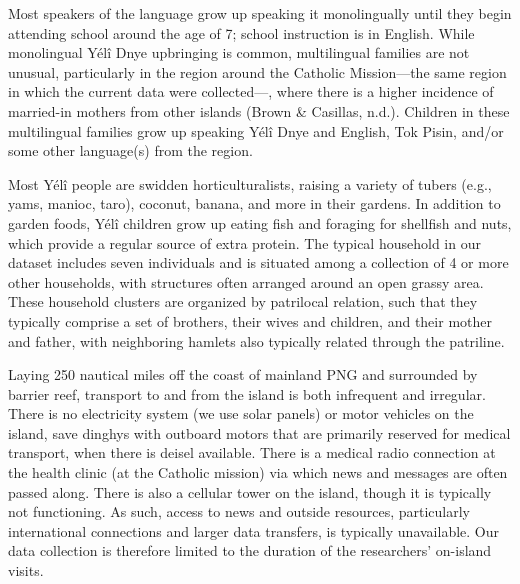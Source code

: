\documentclass[english,,man,floatsintext]{apa6}
\begin{document}
Most speakers of the language grow up speaking it monolingually until they begin attending school around the age of 7;
school instruction is in English. While monolingual Yélî Dnye upbringing is common, multilingual families are not unusual, particularly in the region around the Catholic Mission---the same region in which the current data were collected---, where there is a higher incidence of married-in mothers from other islands (Brown \& Casillas, n.d.). Children in these multilingual families grow up speaking Yélî Dnye and English, Tok Pisin, and/or some other language(s) from the region.

Most Yélî people are swidden horticulturalists, raising a variety of tubers (e.g., yams, manioc, taro), coconut, banana, and more in their gardens. In addition to garden foods, Yélî children grow up eating fish and foraging for shellfish and nuts, which provide a regular source of extra protein. The typical household in our dataset includes seven individuals and is situated among a collection of 4 or more other households, with structures often arranged around an open grassy area. These household clusters are organized by patrilocal relation, such that they typically comprise a set of brothers, their wives and children, and their mother and father, with neighboring hamlets also typically related through the patriline.

Laying 250 nautical miles off the coast of mainland PNG and surrounded by barrier reef, transport to and from the island is both infrequent and irregular. There is no electricity system (we use solar panels) or motor vehicles on the island, save dinghys with outboard motors that are primarily reserved for medical transport, when there is deisel available. There is a medical radio connection at the health clinic (at the Catholic mission) via which news and messages are often passed along. There is also a cellular tower on the island, though it is typically not functioning. As such, access to news and outside resources, particularly international connections and larger data transfers, is typically unavailable. Our data collection is therefore limited to the duration of the researchers' on-island visits.
\end{document}
